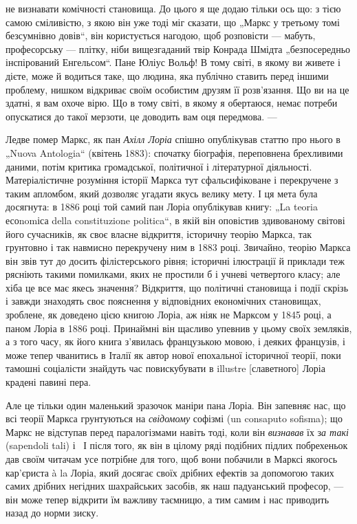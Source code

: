 \parcont{}  %
не визнавати комічності становища. До цього я ще додаю тільки
ось що: з тією самою сміливістю, з якою він уже тоді міг сказати,
що „Маркс у третьому томі безсумнівно довів“, він користується
нагодою, щоб розповісти — мабуть, професорську —
плітку, ніби вищезгаданий твір Конрада Шмідта „безпосередньо
інспірований Енгельсом“. Пане Юліус Вольф! В тому світі, в якому
ви живете і дієте, може й водиться таке, що людина, яка публічно
ставить перед іншими проблему, нишком відкриває своїм
особистим друзям її розв’язання. Що ви на це здатні, я вам охоче
вірю. Що в тому світі, в якому я обертаюся, немає потреби
опускатися до такої мерзоти, це доводить вам оця передмова. —

Ледве помер Маркс, як пан \emph{Ахілл Лоріа} спішно опублікував
статтю про нього в „Nuova Antologia“ (квітень 1883): спочатку
біографія, переповнена брехливими даними, потім критика
громадської, політичної і літературної діяльності. Матеріалістичне
розуміння історії Маркса тут сфальсифіковане і перекручене
з таким апломбом, який дозволяє угадати якусь велику
мету. І ця мета була досягнута: в 1886 році той самий пан
Лоріа опублікував книгу: „La teoria есоnomіса della constituzione
politica“, в якій він оповістив здивованому світові його сучасників,
як своє власне відкриття, історичну теорію Маркса, так
грунтовно і так навмисно перекручену ним в 1883 році. Звичайно,
теорію Маркса він звів тут до досить філістерського
рівня; історичні ілюстрації й приклади теж рясніють такими помилками,
яких не простили б і учневі четвертого класу; але
хіба це все має якесь значення? Відкриття, що політичні становища
і події скрізь і завжди знаходять своє пояснення у відповідних
економічних становищах, зроблене, як доведено цією книгою
Лоріа, аж ніяк не Марксом у 1845 році, а паном Лоріа
в 1886 році. Принаймні він щасливо упевнив у цьому своїх земляків,
а з того часу, як його книга з’явилась французькою мовою,
і деяких французів, і може тепер чванитись в Італії як
автор нової епохальної історичної теорії, поки тамошні соціалісти
знайдуть час повискубувати в illustre [славетного] Лоріа
крадені павині пера.

Але це тільки один маленький зразочок маніри пана Лоріа.
Він запевняє нас, що всі теорії Маркса грунтуються на \emph{свідомому}
софізмі (un consaputo sofisma); що Маркс не відступав
перед паралогізмами навіть тоді, коли він \emph{визнавав} їх з\emph{а такі}
(sapendoli tali) і~ І після того, як він в цілому ряді подібних
підлих побрехеньок дав своїм читачам усе потрібне для
того, щоб вони побачили в Марксі якогось кар’єриста à la Лоріа,
який досягає своїх дрібних ефектів за допомогою таких самих
дрібних негідних шахрайських засобів, як наш падуанський професор,
— він може тепер відкрити їм важливу таємницю, а тим
самим і нас приводить назад до норми зиску.

